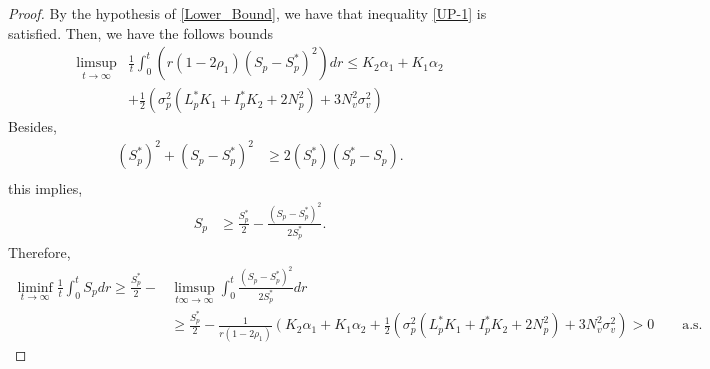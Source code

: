 \begin{proof}
		By the hypothesis of \autoref{Lower_Bound}, 
	we have that inequality \eqref{UP-1} 
	is satisfied. Then, we have the follows bounds
	 \begin{align*}
	 	\limsup
	 		\limits_{t \to \infty}
		 	&
		 	\frac{1}{t}
		 	\int_{0}^{t}
		 	(	r (1 - 2 \rho_1)
		 		\left(
		 			S_p - S_p ^* 
		 		\right) ^2 
		 	)
		 	dr 
		 	\leq 
		 	K_2 \alpha_1 + 
		 	K_1 \alpha_2
		 \\
 		&+
 			\frac{1}{2}
 			\left(
 				\sigma_p^2 
 				(
 					L_p ^* K_1 + 
 					I_p ^ *K_2 + 
 					2 N_p ^ 2
 				) + 
 				3 N_v ^ 2 \sigma_v^2
 			\right)
	\end{align*}
 Besides, 
 \begin{align*}
 	(S_p ^* ) ^ 2 + 
 	(S_p - S_p ^* ) ^ 2
 	&\geq
 	2(S_p ^ *)
 	(S_p ^ * - S_p).
 	\\
 \end{align*}
this implies,
\begin{align*}
	S_p
 		&\geq
 			\frac{S_p ^ *}{2} - 
 			\frac{(S_p - S_p^*)^2}{2 S_p^*}.
\end{align*}
Therefore,
	\begin{align*}
 		\liminf
 		\limits_{t \to \infty}
 		\frac{1}{t}
 		\int_{0} ^ {t} S_p dr
 		\geq
 		\frac{S_p^*}{2}
 		-& 
 		\limsup_{t\infty \to \infty}
 		\int_{0}^{t}
 			\frac{(S_p - S_p ^* )^2}{2S_p^*} 
 		dr
 		\\
	 	&\geq
	 		\frac{S_p^*}{2} - 
	 		\frac{1}{r(1-2\rho_1)}
	 		\left(
	 			K_2 \alpha_1 + 
	 			K_1 \alpha_2
	 		\right. +
 			\frac{1}{2}
 			\left(
 				\sigma_p ^ 2 
 				(
 					L_p ^* K_1 + 
 					I_p ^* K_2 + 2N_p^2
 				) + 
 				3 N_v ^ 2
 				\sigma_v ^ 2
 			\right)
 			>0\qquad\mbox{a.s.}
	\end{align*}


\end{proof}
